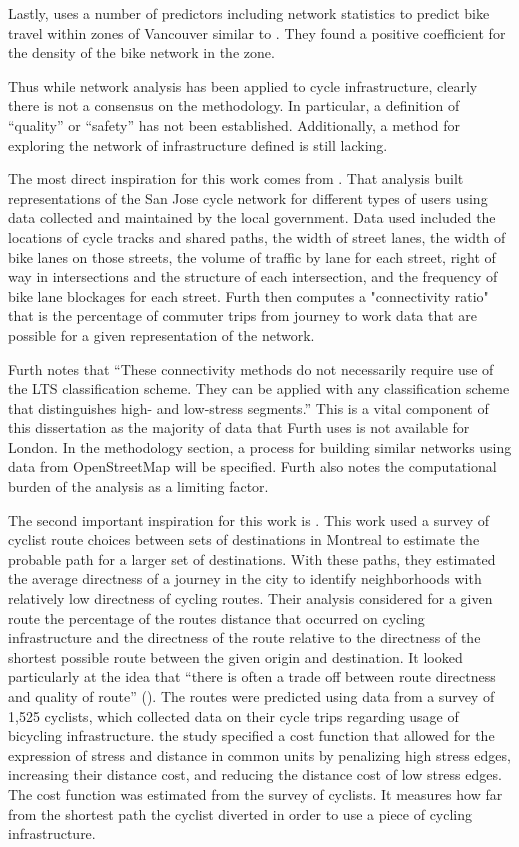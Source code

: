 Lastly, \cite{osama2017models} uses a number of predictors including network statistics to predict bike travel within zones of Vancouver similar to \cite{schoner2014missing}. They found a positive coefficient for the density of the bike network in the zone. 

Thus while network analysis has been applied to cycle infrastructure, clearly there is not a consensus on the methodology. In particular, a definition of ``quality'' or ``safety'' has not been established. Additionally, a method for exploring the network of infrastructure defined is still lacking. 

The most direct inspiration for this work comes from \cite{furth2016network}. That analysis built representations of the San Jose cycle network for different types of users using data collected and maintained by the local government. Data used included the locations of cycle tracks and shared paths, the width of street lanes, the width of bike lanes on those streets,  the volume of traffic by lane for each street, right of way in intersections and the structure of each intersection, and the frequency of bike lane blockages for each street. Furth then computes a "connectivity ratio" that is the percentage of commuter trips from journey to work data that are possible for a given representation of the network. 

Furth notes that ``These connectivity methods do not necessarily require use of the LTS classification scheme. They can be applied with any classification scheme that distinguishes high- and low-stress segments.'' This is a vital component of this dissertation as the majority of data that Furth uses is not available for London. In the methodology section, a process for building similar networks using data from OpenStreetMap will be specified. Furth also notes the computational burden of the analysis as a limiting factor. 

The second important inspiration for this work is \cite{boisjoly2019bicycle}. This work used a survey of cyclist route choices between sets of destinations in Montreal to estimate the probable path for a larger set of destinations. With these paths, they estimated the average directness of a journey in the city to identify neighborhoods with relatively low directness of cycling routes.  Their analysis considered for a given route the percentage of the routes distance that occurred on cycling infrastructure and the directness of the route relative to the directness of the shortest possible route between the given origin and destination. It looked particularly at the idea that ``there is often a trade off between route directness and quality of route'' (\cite{boisjoly2019bicycle}).  The routes were predicted using data from a survey of 1,525 cyclists, which collected data on their cycle trips regarding usage of bicycling infrastructure. the study specified a cost function that allowed for the expression of stress and distance in common units by penalizing high stress edges, increasing their distance cost, and reducing the distance cost of low stress edges. The cost function was estimated from the survey of cyclists. It measures how far from the shortest path the cyclist diverted in order to use a piece of cycling infrastructure. 

